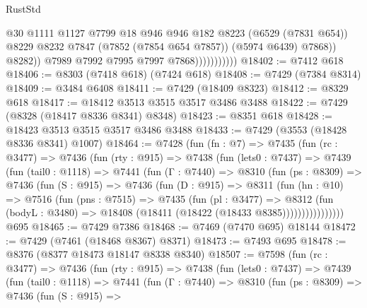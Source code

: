 \begin{lexlean}{RustStd}
\begin{coremodule}
                                  @30
                                  @1111
                                  @1127
                                  @7799
                                  @18
                                  @946
                                  @946
                                  @182
                                  @8223
                                  (@6529 (@7831 @654))
                                  @8229
                                  @8232
                                  @7847
                                  (@7852 (@7854 @654 @7857))
                                  (@5974 @6439)
                                  @7868))
                              @8282))
                          @7989
                          @7992
                          @7995
                          @7997
                          @7868)))))))))))
@18402 := @7412 @618
@18406 := @8303 (@7418 @618) (@7424 @618)
@18408 := @7429 (@7384 @8314)
@18409 := @3484 @6408
@18411 := @7429 (@18409 @8323)
@18412 := @8329 @618
@18417 := @18412 @3513 @3515 @3517 @3486 @3488
@18422 := @7429 (@8328 (@18417 @8336 @8341) @8348)
@18423 := @8351 @618
@18428 := @18423 @3513 @3515 @3517 @3486 @3488
@18433 := @7429 (@3553 (@18428 @8336 @8341) @1007)
@18464 := @7428
    (fun (fn : @7) =>
    @7435
      (fun (rc : @3477) =>
      @7436
        (fun (rty : @915) =>
        @7438
          (fun (lets0 : @7437) =>
          @7439
            (fun (tail0 : @1118) =>
            @7441
              (fun (Γ : @7440) =>
              @8310
                (fun (ps : @8309) =>
                @7436
                  (fun (S : @915) =>
                  @7436
                    (fun (D : @915) =>
                    @8311
                      (fun (hn : @10) =>
                      @7516
                        (fun (pns : @7515) =>
                        @7435
                          (fun (pl : @3477) =>
                          @8312
                            (fun (bodyL : @3480) =>
                            @18408 (@18411 (@18422 (@18433 @8385))))))))))))))))
    @695
@18465 := @7429 @7386
@18468 := @7469 (@7470 @695) @18144
@18472 := @7429 (@7461 (@18468 @8367) @8371)
@18473 := @7493 @695
@18478 := @8376 (@8377 @18473 @18147 @8338 @8340)
@18507 := @7598
    (fun (rc : @3477) =>
    @7436
      (fun (rty : @915) =>
      @7438
        (fun (lets0 : @7437) =>
        @7439
          (fun (tail0 : @1118) =>
          @7441
            (fun (Γ : @7440) =>
            @8310
              (fun (ps : @8309) =>
              @7436
                (fun (S : @915) =>

\end{coremodule}
\end{lexlean}
